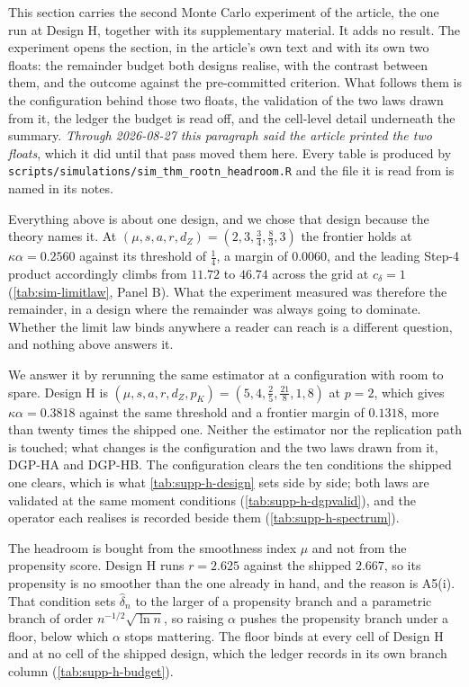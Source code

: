 \documentclass[
  12pt]{article}
\newcommand{\1}[1]{\mathds{1}\left[#1\right]}
\theoremstyle{plain}
\theoremstyle{definition}
\theoremstyle{definition}
\theoremstyle{remark}
\begin{document}
This section carries the second Monte Carlo experiment of the article, the one
run at Design H, together with its supplementary material. It adds no result.
The experiment opens the section, in the article's own text and with its own two
floats: the remainder budget both designs realise, with the contrast between
them, and the outcome against the pre-committed criterion. What follows them is
the configuration behind those two floats, the validation of the two laws drawn
from it, the ledger the budget is read off, and the cell-level detail underneath
the summary. \emph{Through 2026-08-27 this paragraph said the article printed
the two floats}, which it did until that pass moved them here. Every table is
produced by
\texttt{scripts/simulations/sim\_thm\_rootn\_headroom.R} and the file it is read
from is named in its notes.

Everything above is about one design, and we chose that design because the theory
names it. At $(\mu,s,a,r,d_Z)=(2,3,\tfrac34,\tfrac83,3)$ the frontier holds at
$\kappa\alpha=0.2560$ against its threshold of $\tfrac14$, a margin of $0.0060$,
and the leading Step-4 product accordingly climbs from $11.72$ to $46.74$ across
the grid at $c_\delta=1$ (\cref{tab:sim-limitlaw}, Panel B). What the experiment
measured was therefore the remainder, in a design where the remainder was always
going to dominate. Whether the limit law binds anywhere a reader can reach is a
different question, and nothing above answers it.

We answer it by rerunning the same estimator at a configuration with room to
spare. Design H is $(\mu,s,a,r,d_Z,p_K)=(5,4,\tfrac25,\tfrac{21}{8},1,8)$ at
$p=2$, which gives $\kappa\alpha=0.3818$ against the same threshold and a
frontier margin of $0.1318$, more than twenty times the shipped one. Neither the
estimator nor the replication path is touched; what changes is the configuration
and the two laws drawn from it, DGP-HA and DGP-HB. The configuration clears the
ten conditions the shipped one clears, which is what \cref{tab:supp-h-design}
sets side by side; both laws are validated at the same moment conditions (\cref{tab:supp-h-dgpvalid}), and the operator each realises is recorded beside them (\cref{tab:supp-h-spectrum}).

The headroom is bought from the smoothness index $\mu$ and not from the
propensity score. Design H runs $r=2.625$ against the shipped $2.667$, so its
propensity is no smoother than the one already in hand, and the reason is A5(i).
That condition sets $\hat\delta_n$ to the larger of a propensity branch and a
parametric branch of order $n^{-1/2}\sqrt{\ln n}$, so raising $\alpha$ pushes the
propensity branch under a floor, below which $\alpha$ stops mattering. The floor
binds at every cell of Design H and at no cell of the shipped design, which the
ledger records in its own branch column (\cref{tab:supp-h-budget}).
\end{document}
